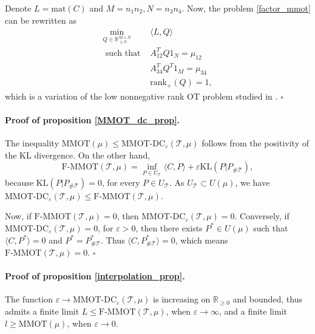 \documentclass{article}
\newcommand{\qed}{\hfill $\square$}
\begin{document}
Denote $L= \text{mat}(C)$ and $M = n_1 n_2, N = n_3 n_4$. Now, the problem \ref{factor_mmot} can be rewritten as
\begin{equation*}
  \begin{split}
    \min_{Q \in \mathbb R^{M \times N}_{\geq 0}} &\langle L, Q \rangle \\
    \text{ such that } & A_{12}^T Q 1_N = \mu_{12} \\
    &A_{34}^T Q^T 1_M = \mu_{34} \\
    &\text{rank}_{+}(Q) = 1,
  \end{split}
\end{equation*}
which is a variation of the low nonnegative rank OT problem studied in \citep{Meyer21a}. \qed

\paragraph{Proof of proposition \ref{MMOT_dc_prop}.} The inequality 
$\text{MMOT}(\mu) \leq \text{MMOT-DC}_{\varepsilon}(\mathcal T, \mu)$ follows from 
the positivity of the KL divergence. On the other hand,
\begin{equation*}
  \text{F-MMOT}(\mathcal T, \mu) = 
  \inf_{P \in U_{\mathcal T}} \langle C, P \rangle + \varepsilon \text{KL}(P \vert P_{\# \mathcal T}),
\end{equation*}
because $\text{KL}(P \vert P_{\# \mathcal T}) = 0$, for every $P \in U_{\mathcal T}$. As 
$U_{\mathcal T} \subset U(\mu)$, we have 
$\text{MMOT-DC}_{\varepsilon}(\mathcal T, \mu) \leq \text{F-MMOT}(\mathcal T, \mu)$.

Now, if $\text{F-MMOT}(\mathcal T, \mu) = 0$, then 
$\text{MMOT-DC}_{\varepsilon}(\mathcal T, \mu) = 0$. Conversely, 
if $\text{MMOT-DC}_{\varepsilon}(\mathcal T, \mu) = 0$, for $\varepsilon > 0$, 
then there exists $P^* \in U(\mu)$ such that $\langle C, P^* \rangle = 0$ and $P^* = P^*_{\# \mathcal T}$. 
Thus $\langle C, P^*_{\# \mathcal T} \rangle = 0$, which means $\text{F-MMOT}(\mathcal T, \mu) = 0$. \qed

\paragraph{Proof of proposition \ref{interpolation_prop}.}
The function $\varepsilon \to \text{MMOT-DC}_{\varepsilon}(\mathcal T, \mu)$ is increasing on $\mathbb R_{\geq 0}$ and bounded, 
thus admits a finite limit $L \leq \text{F-MMOT}(\mathcal T, \mu)$, when $\varepsilon \to \infty$, and a finite limit 
$l \geq \text{MMOT}(\mu)$, when $\varepsilon \to 0$.
\end{document}
